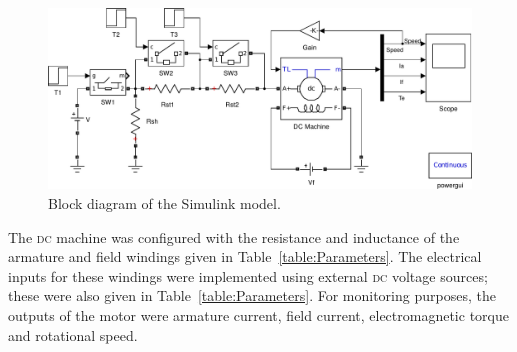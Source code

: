 \documentclass[a4paper,10pt]{article}
\newcommand{\DC}{\textsc{dc}\xspace}
\begin{document}
\begin{figure}[b]
    \centering
    \includegraphics[width=\textwidth]{Model}
    \caption{Block diagram of the Simulink model.}
    \label{fig:Model}
\end{figure}

The \DC machine was configured with the resistance and inductance of the 
armature and field windings given in Table~\vref{table:Parameters}. The 
electrical inputs for these windings were implemented using external \DC 
voltage 
sources; these were also given in Table~\ref{table:Parameters}. For monitoring 
purposes, the outputs of the motor were armature current, field current,
electromagnetic torque and rotational speed.
\end{document}
